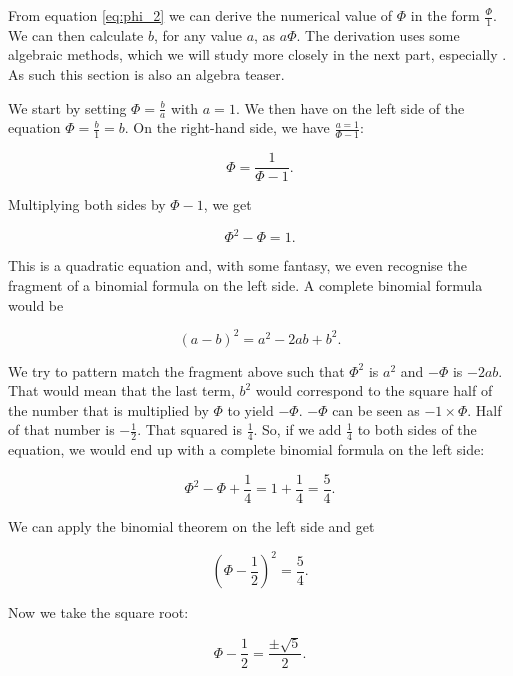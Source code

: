 \documentclass[tikz]{scrreprt}
\begin{document}
From equation \ref{eq:phi_2} we can derive
the numerical value of $\Phi$ in the form
$\frac{\Phi}{1}$.
We can then calculate $b$,
for any value $a$,
as $a\Phi$.
The derivation uses some algebraic methods,
which we will study more closely in the next part,
especially .
As such this section is also an algebra teaser.

We start by setting $\Phi = \frac{b}{a}$
with $a = 1$.
We then have on the left side of the equation
$\Phi = \frac{b}{1} = b$.
On the right-hand side, we have
$\frac{a=1}{\Phi - 1}$:

\begin{equation}
\Phi = \frac{1}{\Phi - 1}.
\end{equation}

Multiplying both sides by $\Phi - 1$,
we get 

\begin{equation}
\Phi^2 - \Phi = 1.
\end{equation}

This is a quadratic equation and,
with some fantasy, we even
recognise the fragment of a binomial formula on the
left side. A complete binomial formula would be

\begin{equation}
(a-b)^2 = a^2-2ab+b^2.
\end{equation}

We try to pattern match the fragment above
such that $\Phi^2$ is $a^2$ and $-\Phi$
is $-2ab$. That would mean that the last term,
$b^2$ would correspond to the square half of the number
that is multiplied by $\Phi$ to yield $-\Phi$.
$-\Phi$ can be seen as $-1 \times \Phi$.
Half of that number is $-\frac{1}{2}$.
That squared is $\frac{1}{4}$.
So, if we add $\frac{1}{4}$ to both sides of the equation,
we would end up with a complete binomial formula on 
the left side:

\begin{equation}
\Phi^2 - \Phi + \frac{1}{4} = 1 + \frac{1}{4} = \frac{5}{4}.
\end{equation}

We can apply the binomial theorem on the left side and get

\begin{equation}
\left(\Phi - \frac{1}{2}\right)^2 = \frac{5}{4}.
\end{equation}

Now we take the square root:

\begin{equation}
\Phi - \frac{1}{2} = \frac{\pm\sqrt{5}}{2}.
\end{equation}
\end{document}

